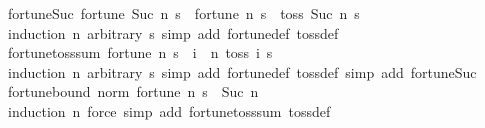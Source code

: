 \begin{isabellebody}
%
\isadelimproof
\isanewline
%
\endisadelimproof
\isanewline
{}\isamarkupfalse%
\ fortune{\isacharunderscore}{\kern0pt}Suc{\isacharcolon}{\kern0pt}\ {\isachardoublequoteopen}fortune\ {\isacharparenleft}{\kern0pt}Suc\ n{\isacharparenright}{\kern0pt}\ s\ {\isacharequal}{\kern0pt}\ fortune\ n\ s\ {\isacharplus}{\kern0pt}\ toss\ {\isacharparenleft}{\kern0pt}Suc\ n{\isacharparenright}{\kern0pt}\ s{\isachardoublequoteclose}\isanewline
%
\isadelimproof
\ \ %
\endisadelimproof
%
\isatagproof
{}\isamarkupfalse%
\ {\isacharparenleft}{\kern0pt}induction\ n\ arbitrary{\isacharcolon}{\kern0pt}\ s{\isacharparenright}{\kern0pt}\ {\isacharparenleft}{\kern0pt}simp\ add{\isacharcolon}{\kern0pt}\ fortune{\isacharunderscore}{\kern0pt}def\ toss{\isacharunderscore}{\kern0pt}def{\isacharparenright}{\kern0pt}{\isacharplus}{\kern0pt}%
\endisatagproof
{\isafoldproof}%
%
\isadelimproof
\isanewline
%
\endisadelimproof
\isanewline
{}\isamarkupfalse%
\ fortune{\isacharunderscore}{\kern0pt}toss{\isacharunderscore}{\kern0pt}sum{\isacharcolon}{\kern0pt}\ {\isachardoublequoteopen}fortune\ n\ s\ {\isacharequal}{\kern0pt}\ {\isacharparenleft}{\kern0pt}{\isasymSum}i\ {\isasymin}\ {\isacharbraceleft}{\kern0pt}{\isachardot}{\kern0pt}{\isachardot}{\kern0pt}n{\isacharbraceright}{\kern0pt}{\isachardot}{\kern0pt}\ toss\ i\ s{\isacharparenright}{\kern0pt}{\isachardoublequoteclose}\isanewline
%
\isadelimproof
\ \ %
\endisadelimproof
%
\isatagproof
{}\isamarkupfalse%
\ {\isacharparenleft}{\kern0pt}induction\ n\ arbitrary{\isacharcolon}{\kern0pt}\ s{\isacharparenright}{\kern0pt}\ {\isacharparenleft}{\kern0pt}simp\ add{\isacharcolon}{\kern0pt}\ fortune{\isacharunderscore}{\kern0pt}def\ toss{\isacharunderscore}{\kern0pt}def{\isacharcomma}{\kern0pt}\ simp\ add{\isacharcolon}{\kern0pt}\ fortune{\isacharunderscore}{\kern0pt}Suc{\isacharparenright}{\kern0pt}%
\endisatagproof
{\isafoldproof}%
%
\isadelimproof
\isanewline
%
\endisadelimproof
\isanewline
{}\isamarkupfalse%
\ fortune{\isacharunderscore}{\kern0pt}bound{\isacharcolon}{\kern0pt}\ {\isachardoublequoteopen}norm\ {\isacharparenleft}{\kern0pt}fortune\ n\ s{\isacharparenright}{\kern0pt}\ {\isasymle}\ Suc\ n{\isachardoublequoteclose}%
\isadelimproof
\ %
\endisadelimproof
%
\isatagproof
{}\isamarkupfalse%
\ {\isacharparenleft}{\kern0pt}induction\ n{\isacharparenright}{\kern0pt}\ {\isacharparenleft}{\kern0pt}force\ simp\ add{\isacharcolon}{\kern0pt}\ fortune{\isacharunderscore}{\kern0pt}toss{\isacharunderscore}{\kern0pt}sum\ toss{\isacharunderscore}{\kern0pt}def{\isacharparenright}{\kern0pt}{\isacharplus}{\kern0pt}%

\end{isabellebody}
